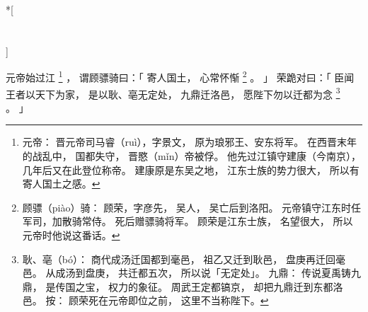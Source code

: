 
\switchcolumn[0]*[\section{}]

元帝始过江%
\footnote{%
    元帝：
        晋元帝司马睿（ruì），字景文，
        原为琅邪王、安东将军。
        在西晋末年的战乱中，
        国都失守，
        晋愍（mǐn）帝被俘。
        他先过江镇守建康（今南京），
        几年后又在此登位称帝。
        建康原是东吴之地，
        江东士族的势力很大，
        所以有寄人国土之感。
}%
，
谓顾骠骑曰：「
    寄人国土，
    心常怀惭%
    \footnote{%
        顾骠（piào）骑：
            顾荣，字彦先，
            吴人，
            吴亡后到洛阳。
            元帝镇守江东时任军司，加散骑常侍。
            死后赠骠骑将军。
            顾荣是江东士族，
            名望很大，
            所以元帝时他说这番话。
    }%
    。
」
荣跪对曰：「
    臣闻王者以天下为家，
    是以耿、亳无定处，
    九鼎迁洛邑，
    愿陛下勿以迁都为念%
    \footnote{%
        耿、亳（bó）：
            商代成汤迁国都到毫邑，
            祖乙又迁到耿邑，
            盘庚再迁回毫邑。
            从成汤到盘庚，
            共迁都五次，
            所以说「无定处」。
        九鼎：
            传说夏禹铸九鼎，
            是传国之宝，
            权力的象征。
            周武王定都镐京，
            却把九鼎迁到东都洛邑。
        按：
            顾荣死在元帝即位之前，
            这里不当称陛下。
    }%
    。
」

\switchcolumn


